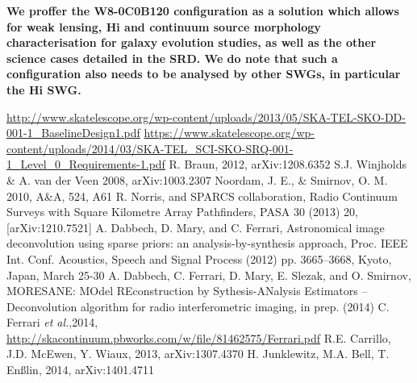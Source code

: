 \documentclass[sfheadings,a4paper,times,9pt,floats,floatfix]{article}
\begin{document}

{\bf We proffer the W8-0C0B120 configuration as a solution which allows for weak lensing, H{\sc i}
and continuum source morphology characterisation for galaxy evolution studies, as well as the other science cases detailed in the
SRD. We do note that such a configuration also needs to be analysed by other SWGs, in particular the H{\sc i}
SWG.}


\begin{thebibliography}{99}
  \url{http://www.skatelescope.org/wp-content/uploads/2013/05/SKA-TEL-SKO-DD-001-1_BaselineDesign1.pdf}
\url{https://www.skatelescope.org/wp-content/uploads/2014/03/SKA-TEL_SCI-SKO-SRQ-001-1_Level_0_Requirements-1.pdf}
  R. Braun, 2012, arXiv:1208.6352 
  S.J. Winjholds \& A. van der Veen 2008, arXiv:1003.2307
  {Noordam, J. E., \& Smirnov, O. M. 2010, A\&A, 524, A61}
  R. Norris, and SPARCS collaboration, Radio Continuum Surveys with Square Kilometre Array
Pathfinders, PASA 30 (2013) 20, [arXiv:1210.7521]
  A. Dabbech, D. Mary, and C. Ferrari, Astronomical image deconvolution using sparse priors: an
analysis-by-synthesis approach, Proc. IEEE Int. Conf. Acoustics, Speech and Signal Process (2012)
pp. 3665--3668, Kyoto, Japan, March 25-30
  A. Dabbech, C. Ferrari, D. Mary, E. Slezak, and O. Smirnov, MORESANE: MOdel REconstruction by
Sythesis-ANalysis Estimators -- Deconvolution algorithm for radio interferometric imaging, in prep. (2014)
  C. Ferrari {\it et al.},2014, \url{http://skacontinuum.pbworks.com/w/file/81462575/Ferrari.pdf}
  R.E. Carrillo, J.D. McEwen, Y. Wiaux, 2013, arXiv:1307.4370
  H. Junklewitz, M.A. Bell, T. En\ss lin, 2014, arXiv:1401.4711



\end{thebibliography}
\pagebreak
\appendix
\end{document}
